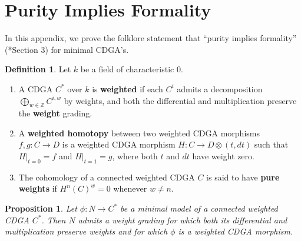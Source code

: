 \documentclass[11pt]{amsart}
\newtheorem{proposition}[theorem]{Proposition}
\theoremstyle{definition}
\newtheorem{definition}[theorem]{Definition}
\numberwithin{equation}{section}
\numberwithin{equation}{section}
\newcommand\ZZ{\mathbb{Z}}
\begin{document}
\section{Purity Implies Formality}

In this appendix, we prove the folklore statement that ``purity implies formality'' (\cite{Emprin-Horel-weight-and-formality}*{Section 3}) for minimal CDGA's.

\begin{definition}\label{Def: weighted CDGA and weighted homotopy}
Let $k$ be a field of characteristic $0$.
\begin{enumerate}[leftmargin=0.25in]
    \item A CDGA $C^*$ over $k$ is \textbf{weighted} if each $C^i$ admits a decomposition $\bigoplus_{w\in \ZZ} C^{i,w}$ by weights, and both the differential and multiplication preserve the \textbf{weight} grading.
    \item A \textbf{weighted homotopy} between two weighted CDGA morphisms $f,g:C\rightarrow D$ is a weighted CDGA morphism $H:C\rightarrow D\otimes (t,dt)$ such that $H\vert_{t=0}=f$ and $H\vert_{t=1}=g$, where both $t$ and $dt$ have weight zero.
    \item The cohomology of a connected weighted CDGA $C$ is said to have \textbf{pure weights} if $H^n(C)^w=0$ whenever $w\neq n$.
\end{enumerate}
\end{definition}

\begin{proposition}\label{prop: existence of weight on a minimal model}
Let $\phi:N\rightarrow C^*$ be a minimal model of a connected weighted CDGA $C^*$. Then $N$ admits a weight grading for which both its differential and multiplication preserve weights and for which $\phi$ is a weighted CDGA morphism.    
\end{proposition}
\end{document}
